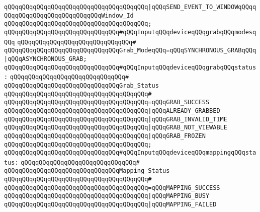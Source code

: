 \verb|qQQqqQQqqQQqqQQqqQQqqQQqqQQqqQQqqQQqqQQq|\verb#|qQQqSEND_EVENT_TO_WINDOWqQQqqQQqqQQqqQQqqQQqqQQqqQQqqQQqWindow_Id#\newline
\verb|qQQqqQQqqQQqqQQqqQQqqQQqqQQqqQQqqQQqqQQq;|\newline
\newline
\verb|qQQqqQQqqQQqqQQqqQQqqQQqqQQqqQQq#qQQqInputqQQqdeviceqQQqgrabqQQqmodesqQQq|\newline
\verb|qQQqqQQqqQQqqQQqqQQqqQQqqQQqqQQq#|\newline
\verb|qQQqqQQqqQQqqQQqqQQqqQQqqQQqqQQqGrab_ModeqQQq=qQQqSYNCHRONOUS_GRABqQQq|\verb#|qQQqASYNCHRONOUS_GRAB;#\newline
\newline
\verb|qQQqqQQqqQQqqQQqqQQqqQQqqQQqqQQq#qQQqInputqQQqdeviceqQQqgrabqQQqstatus:|\newline
\verb|qQQqqQQqqQQqqQQqqQQqqQQqqQQqqQQq#|\newline
\verb|qQQqqQQqqQQqqQQqqQQqqQQqqQQqqQQqGrab_Status|\newline
\verb|qQQqqQQqqQQqqQQqqQQqqQQqqQQqqQQqqQQqqQQq#|\newline
\verb|qQQqqQQqqQQqqQQqqQQqqQQqqQQqqQQqqQQqqQQq=qQQqGRAB_SUCCESS|\newline
\verb|qQQqqQQqqQQqqQQqqQQqqQQqqQQqqQQqqQQqqQQq|\verb#|qQQqALREADY_GRABBED#\newline
\verb|qQQqqQQqqQQqqQQqqQQqqQQqqQQqqQQqqQQqqQQq|\verb#|qQQqGRAB_INVALID_TIME#\newline
\verb|qQQqqQQqqQQqqQQqqQQqqQQqqQQqqQQqqQQqqQQq|\verb#|qQQqGRAB_NOT_VIEWABLE#\newline
\verb|qQQqqQQqqQQqqQQqqQQqqQQqqQQqqQQqqQQqqQQq|\verb#|qQQqGRAB_FROZEN#\newline
\verb|qQQqqQQqqQQqqQQqqQQqqQQqqQQqqQQqqQQqqQQq;|\newline
\newline
\verb|qQQqqQQqqQQqqQQqqQQqqQQqqQQqqQQq#qQQqInputqQQqdeviceqQQqmappingqQQqstatus:|\newline
\verb|qQQqqQQqqQQqqQQqqQQqqQQqqQQqqQQq#|\newline
\verb|qQQqqQQqqQQqqQQqqQQqqQQqqQQqqQQqMapping_Status|\newline
\verb|qQQqqQQqqQQqqQQqqQQqqQQqqQQqqQQqqQQqqQQq#|\newline
\verb|qQQqqQQqqQQqqQQqqQQqqQQqqQQqqQQqqQQqqQQq=qQQqMAPPING_SUCCESS|\newline
\verb|qQQqqQQqqQQqqQQqqQQqqQQqqQQqqQQqqQQqqQQq|\verb#|qQQqMAPPING_BUSY#\newline
\verb|qQQqqQQqqQQqqQQqqQQqqQQqqQQqqQQqqQQqqQQq|\verb#|qQQqMAPPING_FAILED#\newline
